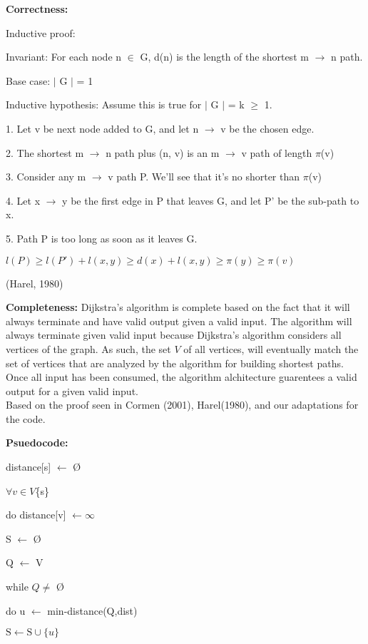 \documentclass{article}
\begin{document}
\textbf{Correctness:} 

Inductive proof:

Invariant: For each node n $\in$ G, d(n) is the length of the shortest m $\rightarrow$ n path.

Base case: $\mid$ G $\mid$  = 1

Inductive hypothesis: Assume this is true for $\mid$ G $\mid$ = k $\geq$ 1.

1. Let v be next node added to G, and let n $\rightarrow$ v be the chosen edge.

2. The shortest m $\rightarrow$ n path plus (n, v) is an m $\rightarrow$ v path of length $\pi$(v)

3. Consider any m $\rightarrow$ v path P.
    We'll see that it's no shorter than $\pi$(v)

4. Let x $\rightarrow$ y be the first edge in P that leaves G, 
    and let P' be the sub-path to x.

5. Path P is too long as soon as it leaves G.

$l(P) \geq l(P') + l(x,y) \geq d(x) + l(x,y) \geq \pi(y) \geq \pi(v)$

(Harel, 1980)


\textbf{Completeness:}
Dijkstra's algorithm is complete based on the fact that it will always terminate and have valid output given a valid input.
The algorithm will always terminate given valid input because Dijkstra's algorithm considers all vertices of the graph. As such, the set $V$ of all vertices, will eventually match the set of vertices that are analyzed by the algorithm for building shortest paths.  Once all input has been consumed, the algorithm alchitecture guarentees a valid output for a given valid input.
\\Based on the proof seen in Cormen (2001), Harel(1980),  and our adaptations for the code.

\textbf{Psuedocode:}

distance[s] $\leftarrow$ \O

$\forall v \in V$\textemdash\{s\}

\hspace{5 pt} do distance[v] $\leftarrow \infty$

S $\leftarrow$ \O

Q $\leftarrow$ V

while $Q \neq$ \O

do u $\leftarrow$ min-distance(Q,dist)

\hspace{5 pt} $\text{S} \leftarrow \text{S} \cup \{u\}$
\end{document}

